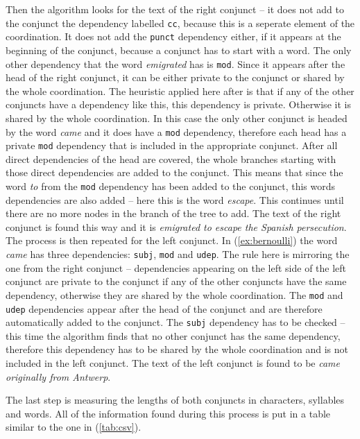 Then the algorithm looks for the text of the right conjunct -- it does not add to the conjunct the dependency labelled \texttt{cc}, because this is a seperate element of the coordination. It does not add the \texttt{punct} dependency either, if it appears at the beginning of the conjunct, because a conjunct has to start with a word. The only other dependency that the word \textsl{emigrated} has is \texttt{mod}. Since it appears after the head of the right conjunct, it can be either private to the conjunct or shared by the whole coordination. The heuristic applied here after \cite{prz:etal:24} is that if any of the other conjuncts have a dependency like this, this dependency is private. Otherwise it is shared by the whole coordination. In this case the only other conjunct is headed by the word \textsl{came} and it does have a \texttt{mod} dependency, therefore each head has a private \texttt{mod} dependency that is included in the appropriate conjunct. After all direct dependencies of the head are covered, the whole branches starting with those direct dependencies are added to the conjunct. This means that since the word \textsl{to} from the \texttt{mod} dependency has been added to the conjunct, this words dependencies are also added -- here this is the word \textsl{escape}. This continues until there are no more nodes in the branch of the tree to add. The text of the right conjunct is found this way and it is \textsl{emigrated to escape the Spanish persecution}. The process is then repeated for the left conjunct. In (\ref{ex:bernoulli}) the word \textsl{came} has three dependencies: \texttt{subj}, \texttt{mod} and \texttt{udep}. The rule here is mirroring the one from the right conjunct -- dependencies appearing on the left side of the left conjunct are private to the conjunct if any of the other conjuncts have the same dependency, otherwise they are shared by the whole coordination. The \texttt{mod} and \texttt{udep} dependencies appear after the head of the conjunct and are therefore automatically added to the conjunct. The \texttt{subj} dependency has to be checked -- this time the algorithm finds that no other conjunct has the same dependency, therefore this dependency has to be shared by the whole coordination and is not included in the left conjunct. The text of the left conjunct is found to be \textsl{came originally from Antwerp}. 

The last step is measuring the lengths of both conjuncts in characters, syllables and words. All of the information found during this process is put in a table similar to the one in (\ref{tab:csv}).

